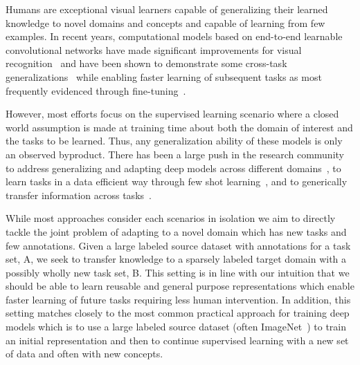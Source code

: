 Humans are exceptional visual learners capable of generalizing their learned knowledge to novel domains and concepts and capable of learning from few examples. %
In recent years, computational models based on end-to-end learnable convolutional networks have made significant improvements for visual recognition~\cite{he2016deep,krizhevsky2012alexnet,simonyan2014vgg} and have been shown to demonstrate some cross-task generalizations~\cite{donahue2014decaf,RazavianASC14} while enabling faster learning of subsequent tasks as most frequently evidenced through fine-tuning~\cite{girshick2014rcnn,long2015learning,ren2015faster}.


However, most efforts focus on the supervised learning scenario where a closed world assumption is made at training time about both the domain of interest and the tasks to be learned. Thus, any generalization ability of these models is only an observed byproduct. There has been a large push in the research community to address generalizing and adapting deep models across different domains~\cite{tzeng2017adversarial,ganin2016domain, sun2016deep, long2016unsupervised}, to learn tasks in a data efficient way through few shot learning~\cite{koch2015siamese,vinyals2016matching,ravi2017optimization,finn2017model}, and to generically transfer information across tasks~\cite{aytar2011tabula,girshick2014rcnn,ren2015faster,long2015fully}. 

While most approaches consider each  scenarios in isolation we aim to directly tackle the joint problem of adapting to a novel domain which has new tasks and few annotations. Given a large labeled source dataset with annotations for a task set, A, we seek to transfer knowledge to a sparsely labeled target domain with a possibly wholly new task set, B. 
This setting is in line with our intuition that we should be able to learn reusable and general purpose representations which enable faster learning of future tasks requiring less human intervention. In addition, this setting matches closely to the most common practical approach for training deep models which is to use a large labeled source dataset (often ImageNet~\cite{imagenet_cvpr09,russakovsky2015imagenet}) to train an initial representation and then to continue supervised learning with a new set of data and often with new concepts.  

